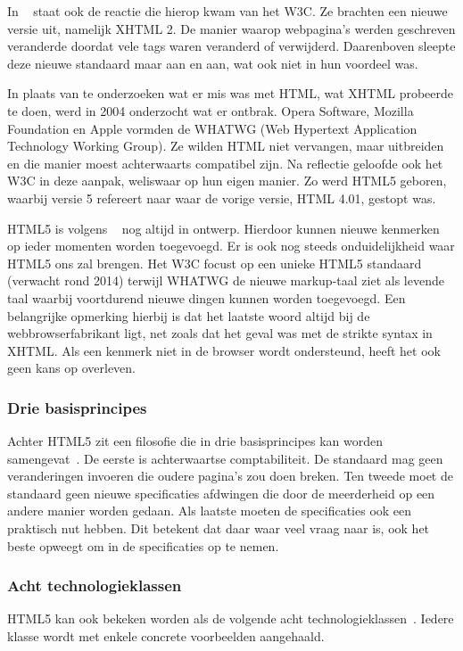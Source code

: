 In ~\cite{MacDonald2011} staat ook de reactie die hierop kwam van het W3C.  
Ze brachten een nieuwe versie uit, namelijk XHTML 2.
De manier waarop webpagina's werden geschreven veranderde doordat vele tags waren veranderd of verwijderd. 
Daarenboven sleepte deze nieuwe standaard maar aan en aan, wat ook niet in hun voordeel was. 

In plaats van te onderzoeken wat er mis was met HTML, wat XHTML probeerde te doen, werd in 2004 onderzocht wat er ontbrak. 
Opera Software, Mozilla Foundation en Apple vormden de WHATWG (Web Hypertext Application Technology Working Group). 
Ze wilden HTML niet vervangen, maar uitbreiden en die manier moest achterwaarts compatibel zijn. Na reflectie geloofde ook het W3C in deze aanpak, weliswaar op hun eigen manier.  
Zo werd HTML5 geboren, waarbij versie 5 refereert naar waar de vorige versie, HTML 4.01, gestopt was.

HTML5 is volgens ~\cite{MacDonald2011} nog altijd in ontwerp. 
Hierdoor kunnen nieuwe kenmerken op ieder momenten worden toegevoegd.  
Er is ook nog steeds onduidelijkheid waar HTML5 ons zal brengen.  
Het W3C focust op een unieke HTML5 standaard (verwacht rond 2014) terwijl WHATWG de nieuwe markup-taal ziet als levende taal waarbij voortdurend  nieuwe dingen kunnen worden toegevoegd. 
Een belangrijke opmerking hierbij is dat het laatste woord altijd bij de webbrowserfabrikant ligt, net zoals dat het geval was met de strikte syntax in XHTML. 
Als een kenmerk niet in de browser wordt ondersteund, heeft het ook geen kans op overleven.

\subsubsection{Drie basisprincipes}
Achter HTML5 zit een filosofie die in drie basisprincipes kan worden samengevat~\cite{MacDonald2011}.  
De eerste is achterwaartse comptabiliteit. De standaard mag geen veranderingen invoeren die oudere pagina's zou doen breken. 
Ten tweede moet de standaard geen nieuwe specificaties afdwingen die door de meerderheid op een andere manier worden gedaan. 
Als laatste moeten de specificaties ook een praktisch nut hebben. 
Dit betekent dat daar waar veel vraag naar is, ook het beste opweegt om in de specificaties op te nemen.

\subsubsection{Acht technologieklassen}
HTML5 kan ook bekeken worden als de volgende acht technologieklassen~\cite{W3C2012}. 
Iedere klasse wordt met enkele concrete voorbeelden aangehaald.

